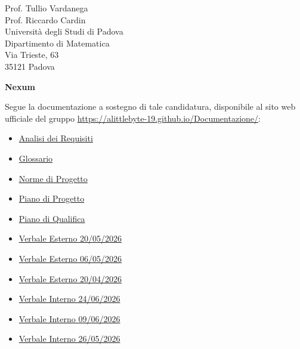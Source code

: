 \documentclass[a4paper,11pt]{letter}
\begin{document}
\begin{letter}{Prof. Tullio Vardanega\\Prof. Riccardo Cardin\\Università degli Studi di Padova\\Dipartimento di Matematica\\Via Trieste, 63\\35121 Padova}
  \begin{center}
      \textbf{Nexum}
  \end{center}

  Segue la documentazione a sostegno di tale candidatura, disponibile al sito web ufficiale del
  gruppo \href{https://alittlebyte-19.github.io/Documentazione/}{https://alittlebyte-19.github.io/Documentazione/}:

  \vspace{0.3em}

  \begin{multicols}{2}
  \begin{itemize}[noitemsep, topsep=0pt]
    \item \href{https://alittlebyte-19.github.io/Documentazione/RTB/Analisi%20dei%20Requisiti/Analisi%20dei%20Requisiti.pdf}{Analisi dei Requisiti}
    \item \href{https://alittlebyte-19.github.io/Documentazione/RTB/Glossario/Glossario.pdf}{Glossario}
    \item \href{https://alittlebyte-19.github.io/Documentazione/RTB/Norme%20di%20Progetto/Norme%20di%20Progetto.pdf}{Norme di Progetto}
    \item \href{https://alittlebyte-19.github.io/Documentazione/RTB/Piano%20di%20Progetto/Piano%20di%20Progetto.pdf}{Piano di Progetto}
    \item \href{https://alittlebyte-19.github.io/Documentazione/RTB/Piano%20di%20Qualifica/Piano%20di%20Qualifica.pdf}{Piano di Qualifica}
    \item \href{https://alittlebyte-19.github.io/Documentazione/RTB/Verbali/Verbali%20Esterni/Verbale_Esterno_2026_05_20.pdf}{Verbale Esterno 20/05/2026}
    \item \href{https://alittlebyte-19.github.io/Documentazione/RTB/Verbali/Verbali%20Esterni/Verbale_Esterno_2026_05_06.pdf}{Verbale Esterno 06/05/2026}
    \item \href{https://alittlebyte-19.github.io/Documentazione/RTB/Verbali/Verbali%20Esterni/Verbale_Esterno_2026_04_20.pdf}{Verbale Esterno 20/04/2026}
    \item \href{https://alittlebyte-19.github.io/Documentazione/RTB/Verbali/Verbali%20Interni/Verbale_Interno_2026_06_24.pdf}{Verbale Interno 24/06/2026}
    \item \href{https://alittlebyte-19.github.io/Documentazione/RTB/Verbali/Verbali%20Interni/Verbale_Interno_2026_06_09.pdf}{Verbale Interno 09/06/2026}
    \item \href{https://alittlebyte-19.github.io/Documentazione/RTB/Verbali/Verbali%20Interni/Verbale_Interno_2026_05_26.pdf}{Verbale Interno 26/05/2026}

\end{itemize}
\end{multicols}
\end{letter}
\end{document}
